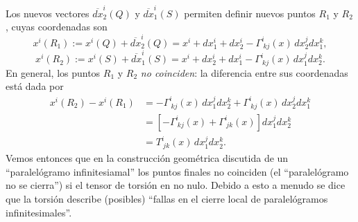 Los nuevos vectores $\overline{dx}_2^i (Q)$ y $\overline{dx}_1^i (S)$ permiten definir nuevos puntos $R_1$ y $R_2$, cuyas coordenadas son
\begin{equation}
x^i(R_1):=x^i(Q)+\overline{dx}_2^i (Q)=x^i+dx_1^i+dx_2^i -\Gamma_{\ kj}^i(x)\, dx_2^j dx_1^k, 
\end{equation}
\begin{equation}
x^i(R_2):=x^i(S)+\overline{dx}_1^i (S)=x^i +dx_2^i +dx_1^i
 -\Gamma_{\ kj}^i(x)\, dx_1^j dx_2^k .
\end{equation}
En general, los puntos $R_1$ y $R_2$ \textit{no coinciden}: la diferencia entre sus coordenadas está dada por
\begin{align}
x^i(R_2)-x^i(R_1) &= -\Gamma_{\ kj}^i(x)\, dx_1^j dx_2^k+ \Gamma_{\ kj}^i(x)\, dx_2^j dx_1^k \\
&=  \left[-\Gamma_{\ kj}^i(x)+ \Gamma_{\ jk}^i(x)\right] dx_1^j dx_2^k \\
&=  T_{\ jk}^i(x)\, dx_1^j dx_2^k .
\end{align}
Vemos entonces que en la construcción geométrica discutida de un ``paralelógramo infinitesiamal'' los puntos finales no coinciden (el ``paralelógramo no se cierra'') si el tensor de torsión en no nulo. Debido a esto a menudo se dice que la torsión describe (posibles) ``fallas en el cierre local de paralelógramos infinitesimales''.



